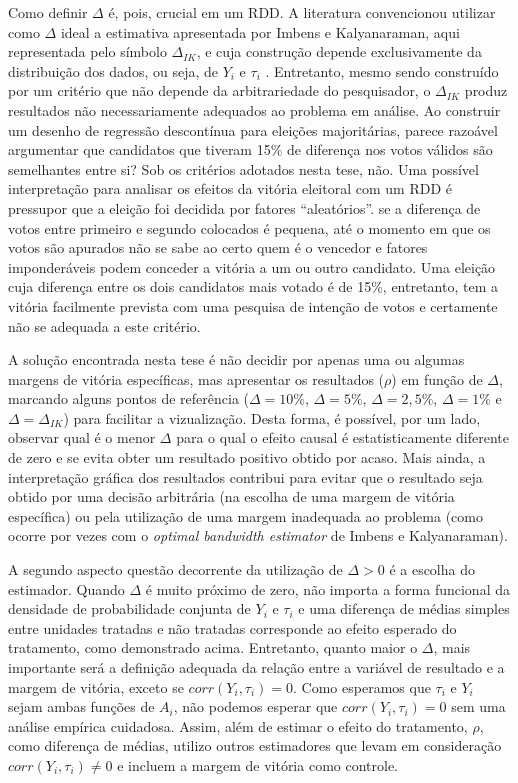 Como definir $\Delta$ é, pois, crucial em um RDD. A literatura convencionou utilizar como $\Delta$ ideal a estimativa apresentada por Imbens e Kalyanaraman, aqui representada pelo símbolo $\Delta_{IK}$, e cuja construção depende exclusivamente da distribuição dos dados, ou seja, de $Y_{i}$ e $\tau_{i}$ \citep{Imbens2011}. Entretanto, mesmo sendo construído por um critério que não depende da arbitrariedade do pesquisador, o $\Delta_{IK}$ produz resultados não necessariamente adequados ao problema em análise. Ao construir um desenho de regressão descontínua para eleições majoritárias, parece razoável argumentar que candidatos que tiveram 15\% de diferença nos votos válidos são semelhantes entre si? Sob os critérios adotados nesta tese, não. Uma possível interpretação para analisar os efeitos da vitória eleitoral com um RDD é pressupor que a eleição foi decidida por fatores ``aleatórios''. se a diferença de votos entre primeiro e segundo colocados é pequena, até o momento em que os votos são apurados não se sabe ao certo quem é o vencedor e fatores imponderáveis podem conceder a vitória a um ou outro candidato. Uma eleição cuja diferença entre os dois candidatos mais votado é de 15\%, entretanto, tem a vitória facilmente prevista com uma pesquisa de intenção de votos e certamente não se adequada a este critério.

A solução encontrada nesta tese é não decidir por apenas uma ou algumas margens de vitória específicas, mas apresentar os resultados ($\rho$) em função de $\Delta$, marcando alguns pontos de referência ($\Delta = 10\%$, $\Delta = 5\%$, $\Delta = 2,5\%$, $\Delta = 1\%$ e $\Delta = \Delta_{IK}$) para facilitar a vizualização. Desta forma, é possível, por um lado, observar qual é o menor $\Delta$ para o qual o efeito causal é estatisticamente diferente de zero e se evita obter um resultado positivo obtido por acaso. Mais ainda, a interpretação gráfica dos resultados contribui para evitar que o resultado seja obtido por uma decisão arbitrária (na escolha de uma margem de vitória específica) ou pela utilização de uma margem inadequada ao problema (como ocorre por vezes com o \emph{optimal bandwidth estimator} de Imbens e Kalyanaraman).

A segundo aspecto questão decorrente da utilização de $\Delta>0$ é a escolha do estimador. Quando $\Delta$ é muito próximo de zero, não importa a forma funcional da densidade de probabilidade conjunta de $Y_{i}$ e $\tau_{i}$ e uma diferença de médias simples entre unidades tratadas e não tratadas corresponde ao efeito esperado do tratamento, como demonstrado acima. Entretanto, quanto maior o $\Delta$, mais importante será a definição adequada da relação entre a variável de resultado e a margem de vitória, exceto se $corr(Y_{i},\tau_{i})=0$. Como esperamos que $\tau_{i}$ e $Y_{i}$ sejam ambas funções de $A_{i}$, não podemos esperar que $corr(Y_{i},\tau_{i})=0$ sem uma análise empírica cuidadosa. Assim, além de estimar o efeito do tratamento, $\rho$, como diferença de médias, utilizo outros estimadores que levam em consideração $corr(Y_{i},\tau_{i}) \ne 0$ e incluem a margem de vitória como controle.

